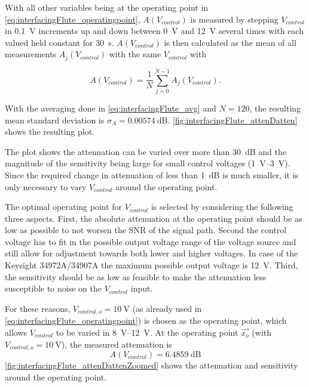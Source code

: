 With all other variables being at the operating point in \autoref{eq:interfacingFlute_operatingpoint}, $A(V_{control})$ is measured by stepping $V_{control}$ in \SI{0.1}{\volt} increments up and down between \SI{0}{\volt} and \SI{12}{\volt} several times with each valued held constant for \SI{30}{\second}. $A(V_{control})$ is then calculated as the mean of all measurements $A_j(V_{control})$ with the same $V_{control}$ with

\begin{equation}\label{eq:interfacingFlute_avg}
A(V_{control}) = \frac{1}{N} \sum_{j=0}^{N-1} A_j(V_{control}).
\end{equation}

With the averaging done in \autoref{eq:interfacingFlute_avg} and $N=120$, the resulting mean standard deviation is $\sigma_A=\SI{0.00574}{\dB}$.
\autoref{fig:interfacingFlute_attenDatten} shows the resulting plot.

The plot shows the attenuation can be varied over more than \SI{30}{\dB} and the magnitude of the sensitivity being large for small control voltages (\SIrange{1}{3}{\volt}).
Since the required change in attenuation of less than \SI{1}{\dB} is much smaller, it is only necessary to vary $V_{control}$ around the operating point.

The optimal operating point for $V_{control}$ is selected by considering the following three aspects.
First, the absolute attenuation at the operating point should be as low as possible to not worsen the SNR of the signal path. Second the control voltage has to fit in the possible output voltage range of the voltage source and still allow for adjustment towards both lower and higher voltages. 
In case of the Keysight 34972A/34907A the maximum possible output voltage is \SI{12}{\volt}.
Third, the sensitivity should be as low as feasible to make the attenuation less susceptible to noise on the $V_{control}$ input.


For these reasons, $V_{control,o}=\SI{10}{\volt}$ (as already used in \autoref{eq:interfacingFlute_operatingpoint}) is chosen as the operating point, which allows $V_{control}$ to be varied in \SIrange{8}{12}{\volt}.
At the operating point $\vec{x_o}$ (with $V_{control,o}=\SI{10}{\volt}$), the measured attenuation is
\begin{equation}
A(V_{control})=\SI{6.4859}{\dB}
\end{equation}
\autoref{fig:interfacingFlute_attenDattenZoomed} shows the attenuation and sensitivity around the operating point.

